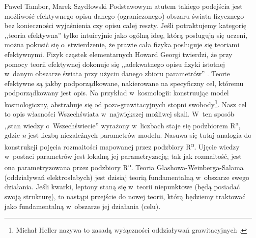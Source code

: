\begin{artplenv2auth}{Paweł Tambor, Marek Szydłowski}
Podstawowym atutem takiego podejścia jest możliwość efektywnego opisu danego (ograniczonego) obszaru świata fizycznego bez konieczności wyjaśnienia czy opisu całej reszty. Jeśli potraktujemy kategorię ,,teoria efektywna'' tylko intuicyjnie jako ogólną ideę, którą posługują się uczeni, można pokusić się o~stwierdzenie, że prawie cała fizyka posługuje się teoriami efektywnymi. Fizyk cząstek elementarnych Howard Georgi twierdzi, że przy pomocy teorii efektywnej dokonuje się ,,adekwatnego opisu fizyki istotnej w~danym obszarze świata przy użyciu danego zbioru parametrów''
\parencite[][]{georgi_effective_1993}. %
 Teorie efektywne są jakby podporządkowane, nakierowane na specyficzny cel, któremu podporządkowany jest opis. Na przykład w~kosmologii: konstruując model kosmologiczny, abstrahuje się od poza-grawitacyjnych stopni swobody\footnote{Michał Heller nazywa to zasadą wyłączności oddziaływań grawitacyjnych 
\parencite[][s.~60]{heller_ewolucyjny_1969}.%
}. Nasz cel to opis własności Wszechświata w~największej możliwej skali. W~ten sposób ,,stan wiedzy o~Wszechświecie'' wyrażony w~liczbach staje się podzbiorem R\textsuperscript{n}, gdzie \textit{n} jest liczbą niezależnych parametrów modelu. Nasuwa się tutaj analogia do konstrukcji pojęcia rozmaitości mapowanej przez podzbiory R\textsuperscript{n}. Ujęcie wiedzy w~postaci parametrów jest lokalną jej parametryzacją; tak jak rozmaitość, jest ona parametryzowana przez podzbiory R\textsuperscript{n}. Teoria Glashowa-Weinberga-Salama (oddziaływań elektrosłabych) jest dzisiaj teorią fundamentalną w~obszarze swego działania. Jeśli kwarki, leptony staną się w~teorii niepunktowe (będą posiadać swoją strukturę), to nastąpi przejście do nowej teorii, którą będziemy traktować jako fundamentalną w~obszarze jej działania (celu).


\end{artplenv2auth}
